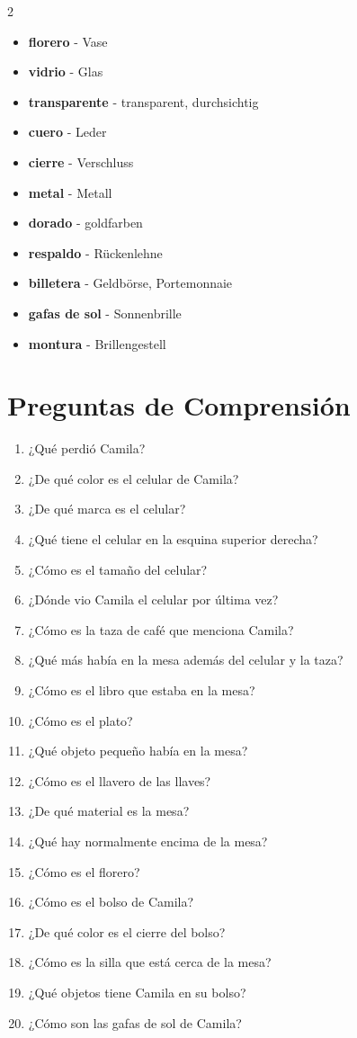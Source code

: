 \documentclass[12pt,a4paper]{article}
\begin{document}
\begin{multicols}{2}
\begin{itemize}[leftmargin=*]
    \item \textbf{florero} - Vase
    \item \textbf{vidrio} - Glas
    \item \textbf{transparente} - transparent, durchsichtig
    \item \textbf{cuero} - Leder
    \item \textbf{cierre} - Verschluss
    \item \textbf{metal} - Metall
    \item \textbf{dorado} - goldfarben
    \item \textbf{respaldo} - Rückenlehne
    \item \textbf{billetera} - Geldbörse, Portemonnaie
    \item \textbf{gafas de sol} - Sonnenbrille
    \item \textbf{montura} - Brillengestell
\end{itemize}
\end{multicols}

\newpage

\section*{Preguntas de Comprensión}

\begin{enumerate}[leftmargin=*]
    \item ¿Qué perdió Camila?
    \item ¿De qué color es el celular de Camila?
    \item ¿De qué marca es el celular?
    \item ¿Qué tiene el celular en la esquina superior derecha?
    \item ¿Cómo es el tamaño del celular?
    \item ¿Dónde vio Camila el celular por última vez?
    \item ¿Cómo es la taza de café que menciona Camila?
    \item ¿Qué más había en la mesa además del celular y la taza?
    \item ¿Cómo es el libro que estaba en la mesa?
    \item ¿Cómo es el plato?
    \item ¿Qué objeto pequeño había en la mesa?
    \item ¿Cómo es el llavero de las llaves?
    \item ¿De qué material es la mesa?
    \item ¿Qué hay normalmente encima de la mesa?
    \item ¿Cómo es el florero?
    \item ¿Cómo es el bolso de Camila?
    \item ¿De qué color es el cierre del bolso?
    \item ¿Cómo es la silla que está cerca de la mesa?
    \item ¿Qué objetos tiene Camila en su bolso?
    \item ¿Cómo son las gafas de sol de Camila?
\end{enumerate}
\end{document}
